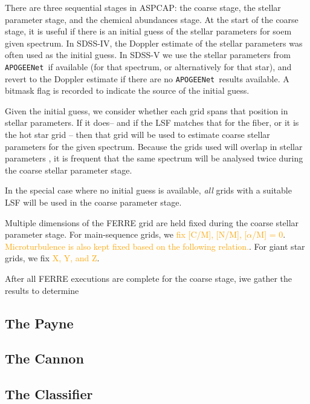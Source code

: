 \documentclass[modern]{aastex631}
\newcommand{\pipeline}[1]{\texttt{#1}}
\newcommand{\APOGEENet}{\pipeline{APOGEENet}}
\newcommand{\todo}[1]{\textcolor{orange}{#1}}
\begin{document}
There are three sequential stages in ASPCAP: 
  the coarse stage, 
  the stellar parameter stage, and 
  the chemical abundances stage. 
At the start of the coarse stage, it is useful if there is an initial guess of the stellar parameters for soem given spectrum. In SDSS-IV, the Doppler estimate of the stellar parameters was often used as the initial guess. In SDSS-V we use the stellar parameters from \APOGEENet\ if available (for that spectrum, or alternatively for that star), and revert to the Doppler estimate if there are no \APOGEENet\ results available. A bitmask flag is recorded to indicate the source of the initial guess.

Given the initial guess, we consider whether each grid spans that position in stellar parameters. If it does-- and if the LSF matches that for the fiber, or it is the hot star grid -- then that grid will be used to estimate coarse stellar parameters for the given spectrum. Because the grids used will overlap in stellar parameters \citep{dr17-grids}, it is frequent that the same spectrum will be analysed twice during the coarse stellar parameter stage. 

In the special case where no initial guess is available, \emph{all} grids with a suitable LSF will be used in the coarse parameter stage. 


Multiple dimensions of the FERRE grid are held fixed during the coarse stellar parameter stage. For main-sequence grids, we \todo{fix [C/M], [N/M], [$\alpha$/M] = 0}. \todo{Microturbulence is also kept fixed based on the following relation.}. For giant star grids, we fix \todo{X, Y, and Z}.

After all FERRE executions are complete for the coarse stage, iwe gather the results to determine    







\subsection{The Payne} \label{sec:methods-the-payne}

\subsection{The Cannon} \label{sec:methods-the-cannon}


\subsection{The Classifier} \label{sec:methods-the-classifier}
\end{document}
